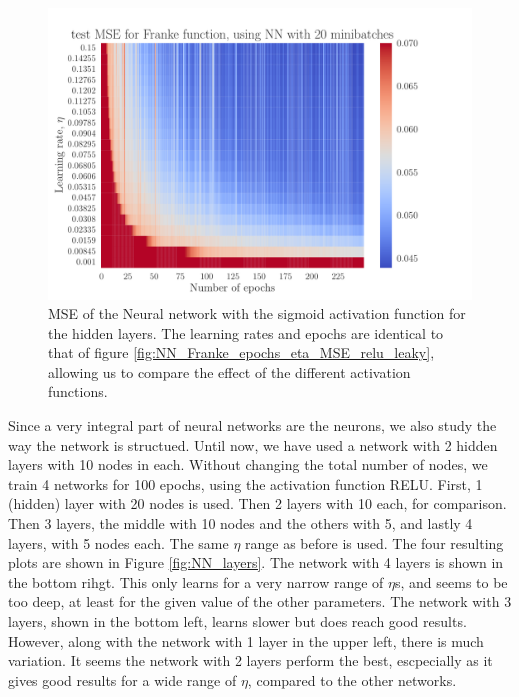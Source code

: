 \documentclass[12pt]{extarticle}
\begin{document}
\begin{figure}[h!]
	\includegraphics[width=0.7\linewidth]{NN_Franke/NN_Franke__epochs_eta__test_MSE__compare__600255.pdf}
	\caption{MSE of the Neural network with the sigmoid activation function for the hidden layers. The learning rates and epochs are identical to that of figure \ref{fig:NN_Franke_epochs_eta_MSE_relu_leaky}, allowing us to compare the effect of the different activation functions.}
	\label{fig:NN_Franke_epochs_eta_MSE_sigmoid_compare}
\end{figure}

Since a very integral part of neural networks are the neurons, we also study the way the network is structued. Until now, we have used a network with 2 hidden layers with 10 nodes in each. Without changing the total number of nodes, we train 4 networks for 100 epochs, using the activation function RELU. First, 1 (hidden) layer with 20 nodes is used. Then 2 layers with 10 each, for comparison. Then 3 layers, the middle with 10 nodes and the others with 5, and lastly 4 layers, with 5 nodes each. The same $\eta$ range as before is used. The four resulting plots are shown in Figure \ref{fig:NN_layers}. The network with 4 layers is shown in the bottom rihgt. This only learns for a very narrow range of $\eta$s, and seems to be too deep, at least for the given value of the other parameters. The network with 3 layers, shown in the bottom left, learns slower but does reach good results. However, along with the network with 1 layer in the upper left, there is much variation. It seems the network with 2 layers perform the best, escpecially as it gives good results for a wide range of $\eta$, compared to the other networks.
\end{document}
